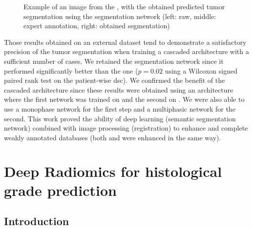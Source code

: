 \begin{figure}
\begin{minipage}{0.3\linewidth}
\end{minipage}
\caption{Example of an image from the \textbf{}, with the obtained predicted tumor
segmentation using the  segmentation network (left: raw,
middle: expert annotation, right: obtained segmentation)}
\label{fig:TCIAMultiphaseTumorPred}
\end{figure}


Those results obtained on an external dataset tend to demonstrate a satisfactory precision
of the tumor segmentation when training a cascaded architecture with a
sufficient number of cases.
We retained the  segmentation network since it performed
significantly better than the  one ($ p = 0.02 $ using a Wilcoxon signed
paired rank test on the patient-wise \ac{dsc}).
We confirmed the benefit of the cascaded architecture since these results
were obtained using an architecture where the first network was trained
on \textbf{} and the second on \textbf{}. We were also able to use
a monophase network for the first step and a multiphasic network for the
second.
This work proved the ability of deep learning (semantic segmentation
network) combined with image processing (registration) to enhance and
complete weakly annotated databases (both \textbf{} and \textbf{} were
enhanced in the same way).




\section{Deep Radiomics for histological grade prediction}

\subsection{Introduction}\label{introduction}

